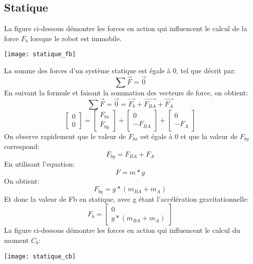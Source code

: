 \documentclass{udes_rapport} %
\begin{document}
\subsection{Statique}
La figure ci-dessous démontre les forces en action qui influencent le calcul de la force $F_b$ lorsque le robot est immobile.
\begin{center}
	\centering
	\texttt{[image: statique\_fb]}
	\label{statique_fb}
\end{center}
La somme des forces d'un système statique est égale à 0, tel que décrit par:
\begin{equation}
	\sum \overrightarrow F = \overrightarrow 0
\end{equation}
En suivant la formule et faisant la sommation des vecteurs de force, on obtient:
	\[	\sum \overrightarrow F = \overrightarrow 0 = \overrightarrow{F_b} + \overrightarrow{F_{BA}} + \overrightarrow{F_A}	\]
	\[	\begin{bmatrix}
	0\\ 
	0
	\end{bmatrix} = \begin{bmatrix}
	F_{bx}\\ 
	F_{by}
	\end{bmatrix} + \begin{bmatrix}
	0\\ 
	-F_{BA}
	\end{bmatrix} + \begin{bmatrix}
	0\\ 
	-F_A
	\end{bmatrix}	\]
On observe rapidement que le valeur de $F_{bx}$ est égale à 0 et que la valeur de $F_{by}$ correspond:
	\[	F_{by} = F_{BA} + F_A 	\]
En utilisant l'equation:
\begin{equation}
	F = m*g
\end{equation}
On obtient:
	\[	F_{by} = g*(m_{BA} + m_A)	\]
Et donc la valeur de Fb en statique, avec g étant l'accélération gravitationnelle:
	\[	F_b = \begin{bmatrix}
	0\\ 
	g*(m_{BA} + m_A)
	\end{bmatrix}	\]
La figure ci-dessous démontre les forces en action qui influencent le calcul du moment $C_b$:
\begin{center}
	\centering
	\texttt{[image: statique\_cb]}
	\label{statique_cb}
\end{center}
\end{document}
